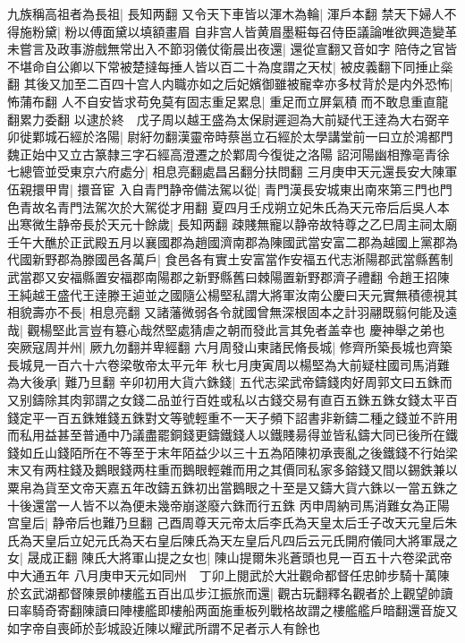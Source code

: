 九族稱高祖者為長祖|{
	長知两翻}
又令天下車皆以渾木為輪|{
	渾戶本翻}
禁天下婦人不得施粉黛|{
	粉以傅面黛以填額畫眉}
自非宫人皆黄眉墨糚每召侍臣議論唯欲興造變革未嘗言及政事游戲無常出入不節羽儀仗衛晨出夜還|{
	還從宣翻又音如字}
陪侍之官皆不堪命自公卿以下常被楚撻每捶人皆以百二十為度謂之天杖|{
	被皮義翻下同捶止橤翻}
其後又加至二百四十宫人内職亦如之后妃嬪御雖被寵幸亦多杖背於是内外恐怖|{
	怖蒲布翻}
人不自安皆求苟免莫有固志重足累息|{
	重足而立屏氣積而不敢息重直龍翻累力委翻}
以逮於終　戊子周以越王盛為太保尉遲迴為大前疑代王逹為大右弼辛卯徙鄴城石經於洛陽|{
	尉紆勿翻漢靈帝時蔡邕立石經於太學講堂前一曰立於鴻都門魏正始中又立古篆隸三字石經高澄遷之於鄴周今復徙之洛陽}
詔河陽幽相豫亳青徐七總管並受東京六府處分|{
	相息亮翻處昌呂翻分扶問翻}
三月庚申天元還長安大陳軍伍親擐甲胄|{
	擐音宦}
入自青門静帝備法駕以從|{
	青門漢長安城東出南來第三門也門色青故名青門法駕次於大駕從才用翻}
夏四月壬戍朔立妃朱氏為天元帝后后吳人本出寒微生静帝長於天元十餘歲|{
	長知两翻}
疎賤無寵以静帝故特尊之乙巳周主祠太廟壬午大醮於正武殿五月以襄國郡為趙國濟南郡為陳國武當安富二郡為越國上黨郡為代國新野郡為滕國邑各萬戶|{
	食邑各有實土安富當作安福五代志淅陽郡武當縣舊制武當郡又安福縣置安福郡南陽郡之新野縣舊曰棘陽置新野郡濟子禮翻}
令趙王招陳王純越王盛代王逹滕王逌並之國隨公楊堅私謂大將軍汝南公慶曰天元實無積德視其相貌壽亦不長|{
	相息亮翻}
又諸藩微弱各令就國曾無深根固本之計羽翮既翦何能及遠哉|{
	觀楊堅此言豈有簒心哉然堅處猜虐之朝而發此言其免者盖幸也}
慶神舉之弟也　突厥寇周并州|{
	厥九勿翻并卑經翻}
六月周發山東諸民脩長城|{
	修齊所築長城也齊築長城見一百六十六卷梁敬帝太平元年}
秋七月庚寅周以楊堅為大前疑柱國司馬消難為大後承|{
	難乃旦翻}
辛卯初用大貨六銖錢|{
	五代志梁武帝鑄錢肉好周郭文曰五銖而又别鑄除其肉郭謂之女錢二品並行百姓或私以古錢交易有直百五銖五銖女錢太平百錢定平一百五銖雉錢五銖對文等號輕重不一天子頻下詔書非新鑄二種之錢並不許用而私用益甚至普通中乃議盡罷銅錢更鑄鐵錢人以鐵賤昜得並皆私鑄大同已後所在鐵錢如丘山錢陌所在不等至于末年陌益少以三十五為陌陳初承喪亂之後鐵錢不行始梁末又有两柱錢及鵝眼錢两柱重而鵝眼輕雜而用之其價同私家多鎔錢又間以錫鉄兼以粟帛為貨至文帝天嘉五年改鑄五銖初出當鵝眼之十至是又鑄大貨六銖以一當五銖之十後還當一人皆不以為便未幾帝崩遂廢六銖而行五銖}
丙申周納司馬消難女為正陽宫皇后|{
	静帝后也難乃旦翻}
己酉周尊天元帝太后李氏為天皇太后壬子改天元皇后朱氏為天皇后立妃元氏為天右皇后陳氏為天左皇后凡四后云元氏開府儀同大將軍晟之女|{
	晟成正翻}
陳氏大將軍山提之女也|{
	陳山提爾朱兆蒼頭也見一百五十六卷梁武帝中大通五年}
八月庚申天元如同州　丁卯上閱武於大壯觀命都督任忠帥步騎十萬陳於玄武湖都督陳景帥樓艦五百出瓜步江振旅而還|{
	觀古玩翻釋名觀者於上觀望帥讀曰率騎奇寄翻陳讀曰陣樓艦即樓船两面施重板列戰格故謂之樓艦艦戶暗翻還音旋又如字帝自喪師於彭城設近陳以耀武所謂不足者示人有餘也}
